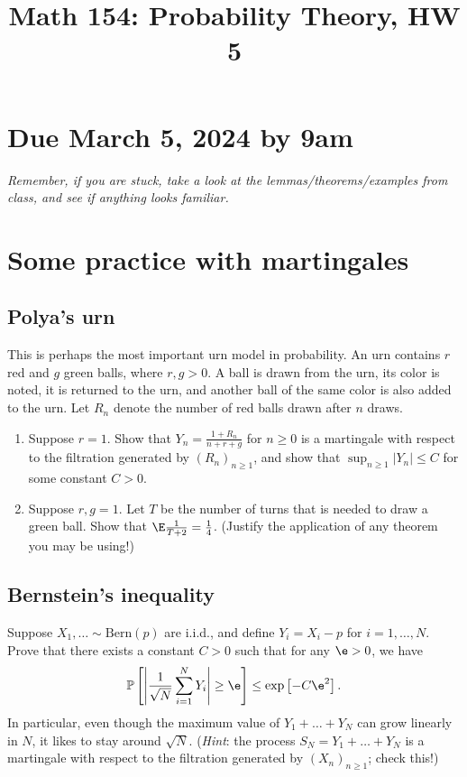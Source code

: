 \documentclass[12pt,reqno]{amsart}
\title{\Large Math 154: Probability Theory, HW 5\vspace{-0.1cm}}
\theoremstyle{definition}
\theoremstyle{remark}
\numberwithin{equation}{section}
\newenvironment{nouppercase}{%
  \let\uppercase\relax%
  \renewcommand{\uppercasenonmath}[1]{}}{}
\begin{document}
\begin{nouppercase}
\maketitle
\end{nouppercase}
\section*{Due March 5, 2024 by 9am}
\emph{Remember, if you are stuck, take a look at the lemmas/theorems/examples from class, and see if anything looks familiar.}
\section{Some practice with martingales}
\subsection{Polya's urn}
This is perhaps the most important urn model in probability. An urn contains $r$ red and $g$ green balls, where $r,g>0$. A ball is drawn from the urn, its color is noted, it is returned to the urn, and another ball of the same color is also added to the urn. Let $R_{n}$ denote the number of red balls {\color{red}drawn} after $n$ draws.
\begin{enumerate}
\item Suppose $r=1$. Show that $Y_{n}=\frac{1+R_{n}}{n+r+g}$ for $n\geq0$ is a martingale with respect to the filtration generated by $(R_{n})_{n\geq1}$, and show that $\sup_{n\geq1}|Y_{n}|\leq C$ for some constant $C>0$.
\item Suppose $r,g=1$. Let $T$ be the number of turns that is needed to draw a green ball. Show that $\E\frac{1}{T+2}=\frac14$. (Justify the application of any theorem you may be using!)
\end{enumerate}
\subsection{Bernstein's inequality}\label{subsection:bernstein}
Suppose $X_{1},\ldots\sim\mathrm{Bern}(p)$ are i.i.d., and define $Y_{i}=X_{i}-p$ for $i=1,\ldots,N$. Prove that there exists a constant $C>0$ such that for any $\e>0$, we have 
%
\begin{align*}
\mathbb{P}\left[\left|\frac{1}{\sqrt{N}}\sum_{i=1}^{N}Y_{i}\right|\geq \e\right]\leq \exp\left[-C\e^{2}\right].
\end{align*}
%
In particular, even though the maximum value of $Y_{1}+\ldots+Y_{N}$ can grow linearly in $N$, it likes to stay around $\sqrt{N}$. (\emph{Hint}: the process $S_{N}=Y_{1}+\ldots+Y_{N}$ is a martingale with respect to the filtration generated by $(X_{n})_{n\geq1}$; check this!)
\end{document}
